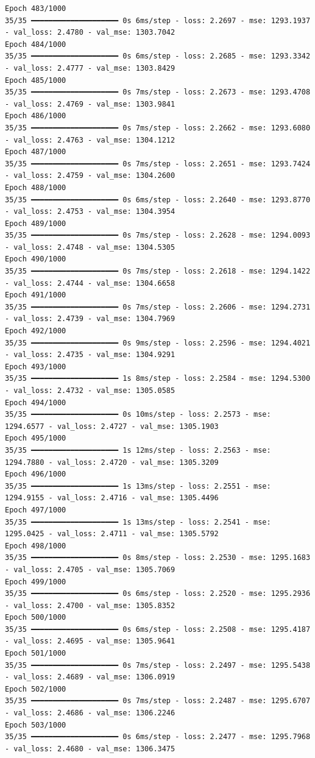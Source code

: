 \documentclass[
  letterpaper,
  DIV=11,
  numbers=noendperiod]{scrreprt}
\begin{document}
\begin{verbatim}
Epoch 483/1000
35/35 ━━━━━━━━━━━━━━━━━━━━ 0s 6ms/step - loss: 2.2697 - mse: 1293.1937 - val_loss: 2.4780 - val_mse: 1303.7042
Epoch 484/1000
35/35 ━━━━━━━━━━━━━━━━━━━━ 0s 6ms/step - loss: 2.2685 - mse: 1293.3342 - val_loss: 2.4777 - val_mse: 1303.8429
Epoch 485/1000
35/35 ━━━━━━━━━━━━━━━━━━━━ 0s 7ms/step - loss: 2.2673 - mse: 1293.4708 - val_loss: 2.4769 - val_mse: 1303.9841
Epoch 486/1000
35/35 ━━━━━━━━━━━━━━━━━━━━ 0s 7ms/step - loss: 2.2662 - mse: 1293.6080 - val_loss: 2.4763 - val_mse: 1304.1212
Epoch 487/1000
35/35 ━━━━━━━━━━━━━━━━━━━━ 0s 7ms/step - loss: 2.2651 - mse: 1293.7424 - val_loss: 2.4759 - val_mse: 1304.2600
Epoch 488/1000
35/35 ━━━━━━━━━━━━━━━━━━━━ 0s 6ms/step - loss: 2.2640 - mse: 1293.8770 - val_loss: 2.4753 - val_mse: 1304.3954
Epoch 489/1000
35/35 ━━━━━━━━━━━━━━━━━━━━ 0s 7ms/step - loss: 2.2628 - mse: 1294.0093 - val_loss: 2.4748 - val_mse: 1304.5305
Epoch 490/1000
35/35 ━━━━━━━━━━━━━━━━━━━━ 0s 7ms/step - loss: 2.2618 - mse: 1294.1422 - val_loss: 2.4744 - val_mse: 1304.6658
Epoch 491/1000
35/35 ━━━━━━━━━━━━━━━━━━━━ 0s 7ms/step - loss: 2.2606 - mse: 1294.2731 - val_loss: 2.4739 - val_mse: 1304.7969
Epoch 492/1000
35/35 ━━━━━━━━━━━━━━━━━━━━ 0s 9ms/step - loss: 2.2596 - mse: 1294.4021 - val_loss: 2.4735 - val_mse: 1304.9291
Epoch 493/1000
35/35 ━━━━━━━━━━━━━━━━━━━━ 1s 8ms/step - loss: 2.2584 - mse: 1294.5300 - val_loss: 2.4732 - val_mse: 1305.0585
Epoch 494/1000
35/35 ━━━━━━━━━━━━━━━━━━━━ 0s 10ms/step - loss: 2.2573 - mse: 1294.6577 - val_loss: 2.4727 - val_mse: 1305.1903
Epoch 495/1000
35/35 ━━━━━━━━━━━━━━━━━━━━ 1s 12ms/step - loss: 2.2563 - mse: 1294.7880 - val_loss: 2.4720 - val_mse: 1305.3209
Epoch 496/1000
35/35 ━━━━━━━━━━━━━━━━━━━━ 1s 13ms/step - loss: 2.2551 - mse: 1294.9155 - val_loss: 2.4716 - val_mse: 1305.4496
Epoch 497/1000
35/35 ━━━━━━━━━━━━━━━━━━━━ 1s 13ms/step - loss: 2.2541 - mse: 1295.0425 - val_loss: 2.4711 - val_mse: 1305.5792
Epoch 498/1000
35/35 ━━━━━━━━━━━━━━━━━━━━ 0s 8ms/step - loss: 2.2530 - mse: 1295.1683 - val_loss: 2.4705 - val_mse: 1305.7069
Epoch 499/1000
35/35 ━━━━━━━━━━━━━━━━━━━━ 0s 6ms/step - loss: 2.2520 - mse: 1295.2936 - val_loss: 2.4700 - val_mse: 1305.8352
Epoch 500/1000
35/35 ━━━━━━━━━━━━━━━━━━━━ 0s 6ms/step - loss: 2.2508 - mse: 1295.4187 - val_loss: 2.4695 - val_mse: 1305.9641
Epoch 501/1000
35/35 ━━━━━━━━━━━━━━━━━━━━ 0s 7ms/step - loss: 2.2497 - mse: 1295.5438 - val_loss: 2.4689 - val_mse: 1306.0919
Epoch 502/1000
35/35 ━━━━━━━━━━━━━━━━━━━━ 0s 7ms/step - loss: 2.2487 - mse: 1295.6707 - val_loss: 2.4686 - val_mse: 1306.2246
Epoch 503/1000
35/35 ━━━━━━━━━━━━━━━━━━━━ 0s 6ms/step - loss: 2.2477 - mse: 1295.7968 - val_loss: 2.4680 - val_mse: 1306.3475

\end{verbatim}
\end{document}
